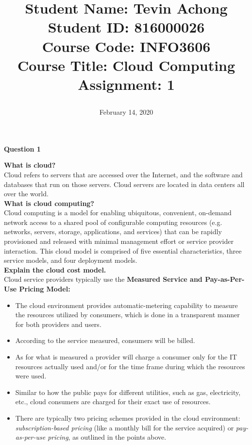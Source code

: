 \documentclass[a4paper, 12pt]{article}
\begin{document}
\title{
		\textbf{Student Name:} Tevin Achong\\
		\textbf{Student ID:} 816000026\\
		\textbf{Course Code:} INFO3606\\
		\textbf{Course Title:} Cloud Computing\\
		\textbf{Assignment:} 1
		\date{February 14, 2020}
}
\maketitle

\newpage
{}

\begin{center}
	\textbf{Question 1}\\
\end{center}

\textbf{What is cloud?}\\
Cloud refers to servers that are accessed over the Internet, and the software and databases that run on those servers. Cloud servers are located in data centers all over the world.\\

\textbf{What is cloud computing?}\\
Cloud computing is a model for enabling ubiquitous, convenient, on-demand network access to a shared pool of configurable computing resources (e.g. networks, servers, storage, applications, and services) that can be rapidly provisioned and released with minimal management effort or service provider interaction. This cloud model is comprised of five essential characteristics, three service models, and four deployment models.\\

\textbf{Explain the cloud cost model.}\\
Cloud service providers typically use the \textbf{Measured Service and Pay-as-Per-Use Pricing Model:}
\begin{itemize}
\item
The cloud environment provides automatic-metering capability to measure the resources utilized by consumers, which is done in a transparent manner for both providers and users.
\item
According to the service measured, consumers will be billed.
\item
As for what is measured a provider will charge a consumer only for the IT resources actually used and/or for the time frame during which the resources were used.
\item
Similar to how the public pays for different utilities, such as gas, electricity,  etc., cloud consumers are charged for their exact use of resources.
\item
There are typically two pricing schemes provided in the cloud environment: \textit{subscription-based pricing} (like a monthly bill for the service acquired) or \textit{pay-as-per-use pricing}, as outlined in the points above.
\end{itemize}
\end{document}
